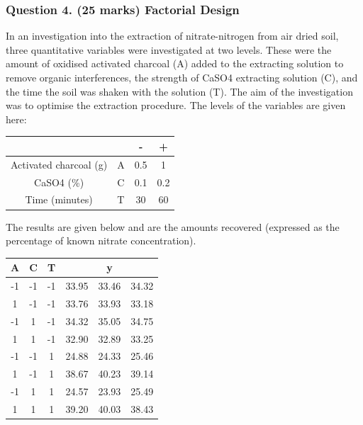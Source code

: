 \documentclass[a4paper,12pt]{article}
\begin{document}
\subsubsection*{Question 4. (25 marks) Factorial Design }



In an investigation into the extraction of nitrate-nitrogen from air dried soil, three quantitative variables were investigated at two levels. These were the amount of oxidised activated charcoal (A) added to the extracting solution to remove organic interferences, the strength of CaSO4 extracting solution (C), and the time the soil was shaken with the solution (T). The aim of the investigation was to optimise the extraction procedure. The levels of the variables are given here:
\begin{center}
	{
		\large
		\begin{tabular}{|cc|c|c|}
			\hline	&		&\phantom{sp}	{\LARGE -}\phantom{sp}	&	\phantom{sp} {\LARGE +} \phantom{sp}	\\ \hline
			Activated charcoal (g) 	&	A 	&	0.5	&	1	\\ \hline
			CaSO{4} (\%) 	&	C 	&	0.1	&	0.2	\\ \hline
			Time (minutes) 	&	T 	&	30	&	60	\\ \hline
		\end{tabular} 
	}
\end{center}

\noindent The results are given below and are the amounts recovered (expressed as the percentage of known nitrate concentration).
{
	\large
	\begin{center}
		\begin{tabular}{|c|c|c|ccc|}
			\hline
			\phantom{sp}A\phantom{sp}	&	\phantom{sp}C\phantom{sp}	&\phantom{sp}	T\phantom{sp}	&	& y	&	\\
			\hline
			-1	&	-1	&	-1	&	33.95 & 33.46 & 34.32 \\ \hline
			
			1	&	-1	&	-1	&	33.76 & 33.93 & 33.18 \\ \hline
			
			-1	&	1	&	-1	&	34.32 & 35.05 & 34.75 \\ \hline
			
			1	&	1	&	-1	&	32.90 & 32.89 & 33.25 \\ \hline
			
			-1	&	-1	&	1	&	24.88 & 24.33 & 25.46 \\ \hline
			
			1	&	-1	&	1	&	38.67 & 40.23 & 39.14 \\ \hline
			
			-1	&	1	&	1	&	24.57 & 23.93 & 25.49 \\ \hline						
			1	&	1	&	1	&	39.20 & 40.03 & 38.43 \\ \hline
		\end{tabular}
	\end{center}
}
\end{document}
